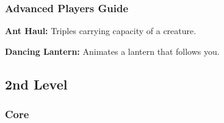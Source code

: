 \documentclass{spelllist}
\begin{document}
  \subsubsection*{Advanced Players Guide}
  \begin{flushleft}
    \textbf{Ant Haul:} Triples carrying capacity of a creature.
    
    \textbf{Dancing Lantern:} Animates a lantern that follows you.
  \end{flushleft}
  
  \subsection*{2nd Level}
  \subsubsection*{Core}
  
\end{document}
